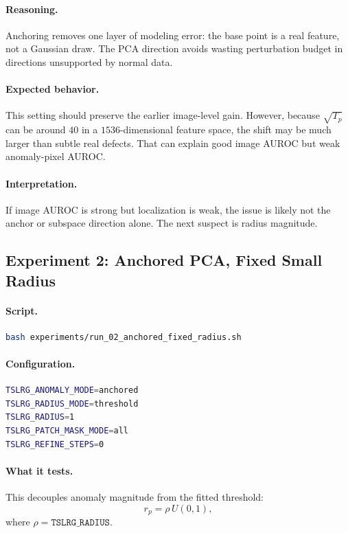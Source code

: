 \documentclass[11pt]{article}
\newcommand{\code}[1]{\texttt{#1}}
\begin{document}
\paragraph{Reasoning.}
Anchoring removes one layer of modeling error: the base point is a real feature,
not a Gaussian draw. The PCA direction avoids wasting perturbation budget in
directions unsupported by normal data.

\paragraph{Expected behavior.}
This setting should preserve the earlier image-level gain. However, because
$\sqrt{T_p}$ can be around $40$ in a $1536$-dimensional feature space, the shift
may be much larger than subtle real defects. That can explain good image AUROC
but weak anomaly-pixel AUROC.

\paragraph{Interpretation.}
If image AUROC is strong but localization is weak, the issue is likely not the
anchor or subspace direction alone. The next suspect is radius magnitude.

\subsection{Experiment 2: Anchored PCA, Fixed Small Radius}

\paragraph{Script.}
\begin{lstlisting}[language=bash]
bash experiments/run_02_anchored_fixed_radius.sh
\end{lstlisting}

\paragraph{Configuration.}
\begin{lstlisting}[language=bash]
TSLRG_ANOMALY_MODE=anchored
TSLRG_RADIUS_MODE=threshold
TSLRG_RADIUS=1
TSLRG_PATCH_MASK_MODE=all
TSLRG_REFINE_STEPS=0
\end{lstlisting}

\paragraph{What it tests.}
This decouples anomaly magnitude from the fitted threshold:
\begin{equation}
  r_p = \rho\,U(0,1),
\end{equation}
where $\rho=\code{TSLRG\_RADIUS}$.
\end{document}
